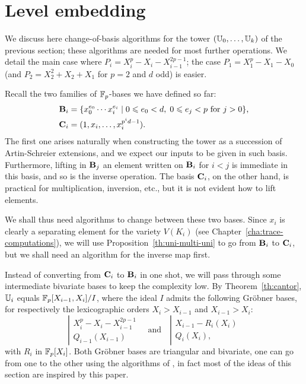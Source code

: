 \section{Level embedding}
\label{sec:level-embedding}

We discuss here change-of-basis algorithms for the tower $(\mathbb{U}_0,
\ldots, \mathbb{U}_k)$ of the previous section; these algorithms are needed
for most further operations. We detail the main case where $P_i =
X_i^p - X_i - X_{i-1}^{2p-1}$; the case $P_1= X_1^p - X_1 - X_0$ (and
$P_2=X_2^2+X_2+X_1$ for $p=2$ and $d$ odd) is easier.

Recall the two families of $\mathbb{F}_p$-bases we have defined so far:
\begin{align}
  \mathbf{B}_i &=
  \{x_0^{e_0} \cdots x_i^{e_i} \;|\; 0 \leqslant e_0 < d,\; 0\leqslant e_j < p 
  \text{ for $j>0$}\}
  \text{,}\\
  \mathbf{C}_i &=(1,x_i,\dots,x_i^{p^id-1})
  \text{.}  
\end{align}
The first one arises naturally when constructing the tower as a
succession of Artin-Schreier extensions, and we expect our inputs to
be given in such basis. Furthermore, lifting in $\mathbf{B}_j$ an
element written on $\mathbf{B}_i$ for $i<j$ is immediate in this basis,
and so is the inverse operation. The basis $\mathbf{C}_i$, on the
other hand, is practical for multiplication, inversion, etc., but it
is not evident how to lift elements.

We shall thus need algorithms to change between these two bases. Since
$x_i$ is clearly a separating element for the variety $V(K_i)$ (see
Chapter~\ref{cha:trace-computations}), we will use
Proposition~\ref{th:uni-multi-uni} to go from $\mathbf{B}_i$ to
$\mathbf{C}_i$, but we shall need an algorithm for the inverse map first.

Instead of converting from $\mathbf{C}_i$ to $\mathbf{B}_i$ in one shot,
we will pass through some intermediate bivariate bases to keep the
complexity low. By Theorem~\ref{th:cantor}, $\mathbb{U}_i$ equals
$\mathbb{F}_p[X_{i-1},X_i]/I$, where the ideal $I$ admits the following
Gr{\"o}bner bases, for respectively the lexicographic orders
$X_i>X_{i-1}$ and $X_{i-1}>X_i$:
\begin{equation}
  \left |
  \begin{array}{rl}
    X_i^p - X_i - X_{i-1}^{2p-1} \\
    Q_{i-1}(X_{i-1})         
  \end{array}
\right.
  \quad \text{and}\quad
  \left |
  \begin{array}{rl}
    X_{i-1} - R_i(X_i) \\
    Q_i(X_i),
  \end{array}
\right.
\end{equation}
with $R_i$ in $\mathbb{F}_p[X_i]$. Both Gröbner bases are triangular and
bivariate, one can go from one to the other using the algorithms of
\cite{pascal+schost06}, in fact most of the ideas of this section are
inspired by this paper.

